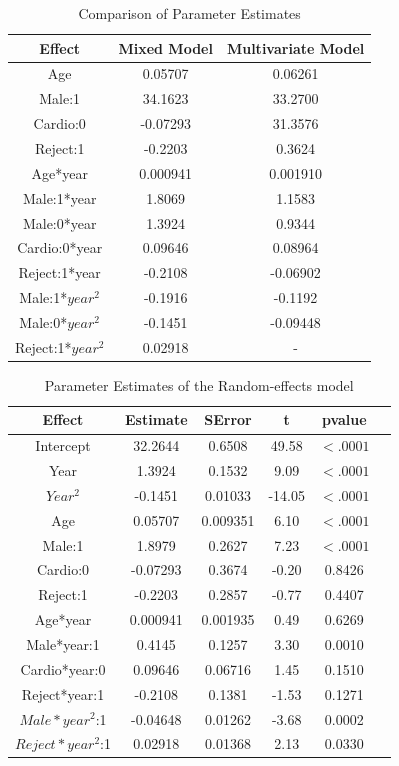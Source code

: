 \documentclass[11pt]{article}
\begin{document}
\begin{table}[H]
\centering
\begin{tabular}{ccc}
\hline
 Effect & Mixed Model & Multivariate Model \\
 \hline
Age & 0.05707 & 0.06261 \\
Male:1 & 34.1623 & 33.2700\\
Cardio:0 & -0.07293 & 31.3576 \\
Reject:1 & -0.2203 & 0.3624 \\
Age*year & 0.000941 & 0.001910\\
Male:1*year & 1.8069 & 1.1583\\
Male:0*year & 1.3924 & 0.9344\\
Cardio:0*year & 0.09646& 0.08964\\
Reject:1*year & -0.2108  & -0.06902\\
Male:1*$year^2$ & -0.1916 & -0.1192\\
Male:0*$year^2$ & -0.1451 & -0.09448\\
Reject:1*$year^2$ & 0.02918  & -\\
\hline
\end{tabular}
\caption{Comparison of Parameter Estimates}
\end{table}

\begin{table}[H]
\centering
\begin{tabular}{cccccc}
\hline
 Effect & Estimate & SError & t & pvalue\\
 \hline
Intercept & 32.2644 & 0.6508  &  49.58  & $<.0001$\\ 
Year & 1.3924 & 0.1532 &9.09  & $<.0001$ \\
$Year^2$ & -0.1451 &  0.01033 & -14.05 & $<.0001$ \\
Age & 0.05707 & 0.009351&   6.10& $<.0001$ \\
Male:1 & 1.8979 & 0.2627 & 7.23 & $<.0001$ \\
Cardio:0 & -0.07293 &  0.3674 &  -0.20 &  0.8426 \\
Reject:1 & -0.2203 & 0.2857 & -0.77 & 0.4407\\
Age*year & 0.000941 &0.001935 & 0.49 & 0.6269\\
Male*year:1 &0.4145 &   0.1257  &  3.30 & 0.0010\\
Cardio*year:0 & 0.09646& 0.06716 & 1.45 &0.1510\\
Reject*year:1 & -0.2108  &   0.1381 & -1.53  &  0.1271\\
$Male*year^2$:1 &-0.04648 &  0.01262& -3.68  & 0.0002\\
$Reject*year^2$:1 & 0.02918  & 0.01368 &  2.13 &  0.0330\\
\hline
\end{tabular}
\caption{Parameter Estimates of the Random-effects model}
\end{table}
\end{document}
